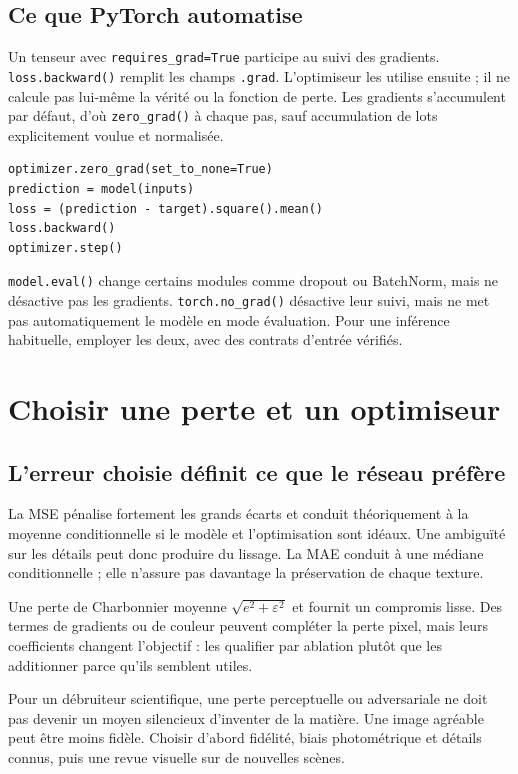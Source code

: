 \documentclass[12pt,a4paper,oneside]{report}
\begin{document}
\section{Ce que PyTorch automatise}

Un tenseur avec \texttt{requires\_grad=True} participe au suivi des gradients.
\texttt{loss.backward()} remplit les champs \texttt{.grad}. L'optimiseur les
utilise ensuite ; il ne calcule pas lui-même la vérité ou la fonction de perte.
Les gradients s'accumulent par défaut, d'où \texttt{zero\_grad()} à chaque pas,
sauf accumulation de lots explicitement voulue et normalisée.

\begin{lstlisting}
optimizer.zero_grad(set_to_none=True)
prediction = model(inputs)
loss = (prediction - target).square().mean()
loss.backward()
optimizer.step()
\end{lstlisting}

\texttt{model.eval()} change certains modules comme dropout ou BatchNorm,
mais ne désactive pas les gradients. \texttt{torch.no\_grad()} désactive leur
suivi, mais ne met pas automatiquement le modèle en mode évaluation. Pour une
inférence habituelle, employer les deux, avec des contrats d'entrée vérifiés.

\chapter{Choisir une perte et un optimiseur}

\section{L'erreur choisie définit ce que le réseau préfère}

La MSE pénalise fortement les grands écarts et conduit théoriquement à la
moyenne conditionnelle si le modèle et l'optimisation sont idéaux. Une ambiguïté
sur les détails peut donc produire du lissage. La MAE conduit à une médiane
conditionnelle ; elle n'assure pas davantage la préservation de chaque texture.

Une perte de Charbonnier moyenne $\sqrt{e^2+\varepsilon^2}$ et fournit un
compromis lisse. Des termes de gradients ou de couleur peuvent compléter la
perte pixel, mais leurs coefficients changent l'objectif : les qualifier par
ablation plutôt que les additionner parce qu'ils semblent utiles.

Pour un débruiteur scientifique, une perte perceptuelle ou adversariale ne doit
pas devenir un moyen silencieux d'inventer de la matière. Une image agréable
peut être moins fidèle. Choisir d'abord fidélité, biais photométrique et détails
connus, puis une revue visuelle sur de nouvelles scènes.
\end{document}
